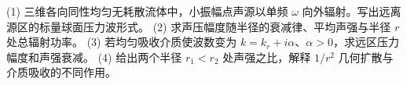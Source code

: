 (1) 三维各向同性均匀无耗散流体中，小振幅点声源以单频 \(\omega\) 向外辐射。写出远离源区的标量球面压力波形式。
(2) 求声压幅度随半径的衰减律、平均声强与半径 \(r\) 处总辐射功率。
(3) 若均匀吸收介质使波数变为 \(k=k_r+i\alpha\)、\(\alpha>0\)，求远区压力幅度和声强衰减。
(4) 给出两个半径 \(r_1<r_2\) 处声强之比，解释 \(1/r^2\) 几何扩散与介质吸收的不同作用。
